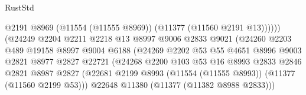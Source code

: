 \begin{lexlean}{RustStd}
\begin{coremodule}
                                              @2191
                                              @8969
                                              (@11554 (@11555 @8969))
                                              (@11377 (@11560 @2191 @13))))))
                                      (@24249
                                        @2204
                                        @2211
                                        @2218
                                        @13
                                        @8997
                                        @9006
                                        @2833
                                        @9021
                                        (@24260
                                          @2203
                                          @489
                                          @19158
                                          @8997
                                          @9004
                                          @6188
                                          (@24269
                                            @2202
                                            @53
                                            @55
                                            @4651
                                            @8996
                                            @9003
                                            @2821
                                            @8977
                                            @2827
                                            @22721
                                            (@24268
                                              @2200
                                              @103
                                              @53
                                              @16
                                              @8993
                                              @2833
                                              @2846
                                              @2821
                                              @8987
                                              @2827
                                              (@22681
                                                @2199
                                                @8993
                                                (@11554 (@11555 @8993))
                                                (@11377 (@11560 @2199 @53)))
                                              @22648
                                              @11380
                                              (@11377 (@11382 @8988 @2833)))

\end{coremodule}
\end{lexlean}
